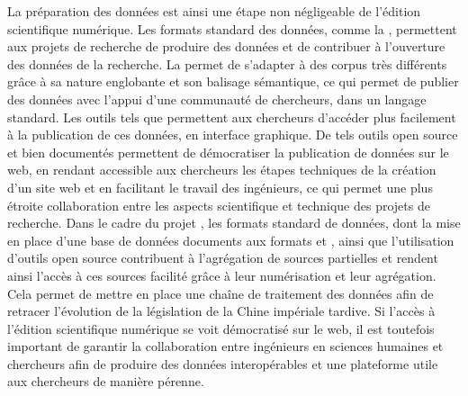 La préparation des données est ainsi une étape non négligeable de l'édition scientifique numérique. Les formats standard des données, comme la \TEI, permettent aux projets de recherche de produire des données \fair et de contribuer à l'ouverture des données de la recherche. La \TEI permet de s'adapter à des corpus très différents grâce à sa nature englobante et son balisage sémantique, ce qui permet de publier des données avec l'appui d'une communauté de chercheurs, dans un langage standard. Les outils tels que \tp permettent aux chercheurs d'accéder plus facilement à la publication de ces données, en interface graphique. De tels outils open source et bien documentés permettent de démocratiser la publication de données sur le web, en rendant accessible aux chercheurs les étapes techniques de la création d'un site web et en facilitant le travail des ingénieurs, ce qui permet une plus étroite collaboration entre les aspects scientifique et technique des projets de recherche. Dans le cadre du projet \COREL, les formats standard de données, dont la mise en place d'une base de données documents aux formats \XML et \JSON, ainsi que l'utilisation d'outils open source contribuent à l'agrégation de sources partielles et rendent ainsi l'accès à ces sources facilité grâce à leur numérisation et leur agrégation. Cela permet de mettre en place une chaîne de traitement des données afin de retracer l'évolution de la législation de la Chine impériale tardive. Si l'accès à l'édition scientifique numérique se voit démocratisé sur le web, il est toutefois important de garantir la collaboration entre ingénieurs en sciences humaines et chercheurs afin de produire des données interopérables et une plateforme utile aux chercheurs de manière pérenne. 